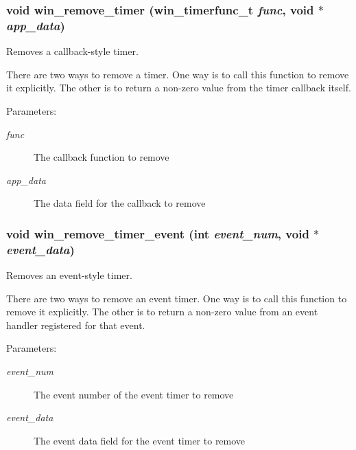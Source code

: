 \subsubsection{\setlength{\rightskip}{0pt plus 5cm}void win\_\-remove\_\-timer ({\bf win\_\-timerfunc\_\-t} {\em func}, void $\ast$ {\em app\_\-data})}\label{wintimer_8h_a3}


Removes a callback-style timer. 

There are two ways to remove a timer. One way is to call this function to remove it explicitly. The other is to return a non-zero value from the timer callback itself.

\begin{Desc}
\item[Parameters:]
\begin{description}
\item[{\em func}]The callback function to remove \item[{\em app\_\-data}]The data field for the callback to remove \end{description}
\end{Desc}
\subsubsection{\setlength{\rightskip}{0pt plus 5cm}void win\_\-remove\_\-timer\_\-event (int {\em event\_\-num}, void $\ast$ {\em event\_\-data})}\label{wintimer_8h_a4}


Removes an event-style timer. 

There are two ways to remove an event timer. One way is to call this function to remove it explicitly. The other is to return a non-zero value from an event handler registered for that event.

\begin{Desc}
\item[Parameters:]
\begin{description}
\item[{\em event\_\-num}]The event number of the event timer to remove \item[{\em event\_\-data}]The event data field for the event timer to remove \end{description}
\end{Desc}
